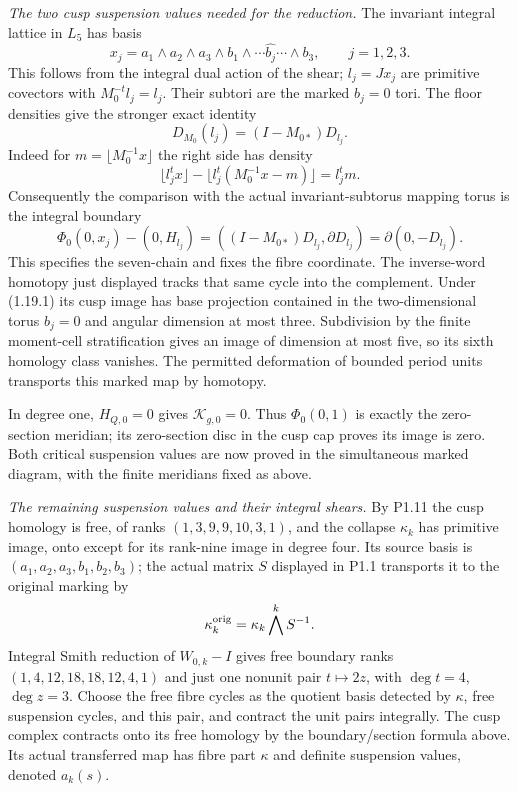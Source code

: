\item \emph{The two cusp suspension values needed for the reduction.}
The invariant integral lattice in $L_5$ has basis
\[
 x_j=a_1\wedge a_2\wedge a_3\wedge
 b_1\wedge\cdots\widehat{b_j}\cdots\wedge b_3,
 \qquad j=1,2,3.
\]
This follows from the integral dual action of the shear;
$l_j=Jx_j$ are primitive covectors with $M_0^{-t}l_j=l_j$.
Their subtori are the marked $b_j=0$ tori. The floor densities give
the stronger exact identity
\[
 D_{M_0}(l_j)=(I-M_{0*})D_{l_j}.
\]
Indeed for $m=\lfloor M_0^{-1}x\rfloor$ the right side has density
\[
 \lfloor l_j^tx\rfloor-
 \lfloor l_j^t(M_0^{-1}x-m)\rfloor=l_j^tm.
\]
Consequently the comparison with the actual invariant-subtorus
mapping torus is the integral boundary
\[
 \Phi_0(0,x_j)-(0,H_{l_j})
 =((I-M_{0*})D_{l_j},\partial D_{l_j})
 =\partial(0,-D_{l_j}).
\]
This specifies the seven-chain and fixes the fibre coordinate.
The inverse-word homotopy just displayed tracks that same cycle
into the complement. Under (1.19.1) its cusp image has base
projection contained in the two-dimensional torus $b_j=0$ and
angular dimension at most three. Subdivision by the finite
moment-cell stratification gives an image of dimension at most five,
so its sixth homology class vanishes. The permitted deformation of
bounded period units transports this marked map by homotopy.

In degree one, $H_{Q,0}=0$ gives $\mathcal K_{g,0}=0$.
Thus $\Phi_0(0,1)$ is exactly the zero-section meridian; its
zero-section disc in the cusp cap proves its image is zero.
Both critical suspension values are now proved in the simultaneous
marked diagram, with the finite meridians fixed as above.

\item \emph{The remaining suspension values and their integral shears.}
By P1.11 the cusp homology is free, of ranks
$(1,3,9,9,10,3,1)$, and the collapse $\kappa_k$ has primitive
image, onto except for its rank-nine image in degree four.
Its source basis is $(a_1,a_2,a_3,b_1,b_2,b_3)$; the actual matrix
$S$ displayed in P1.1 transports it to the original marking by
\[
 \kappa_k^{\rm orig}=\kappa_k\bigwedge^kS^{-1}.
\]
Integral Smith reduction of $W_{0,k}-I$ gives free boundary ranks
$(1,4,12,18,18,12,4,1)$ and just one nonunit pair
$t\mapsto2z$, with $\deg t=4$, $\deg z=3$.
Choose the free fibre cycles as the quotient basis detected by
$\kappa$, free suspension cycles, and this pair, and contract
the unit pairs integrally. The cusp complex contracts onto its free
homology by the boundary/section formula above. Its actual
transferred map has fibre part $\kappa$ and definite suspension
values, denoted $a_k(s)$.

